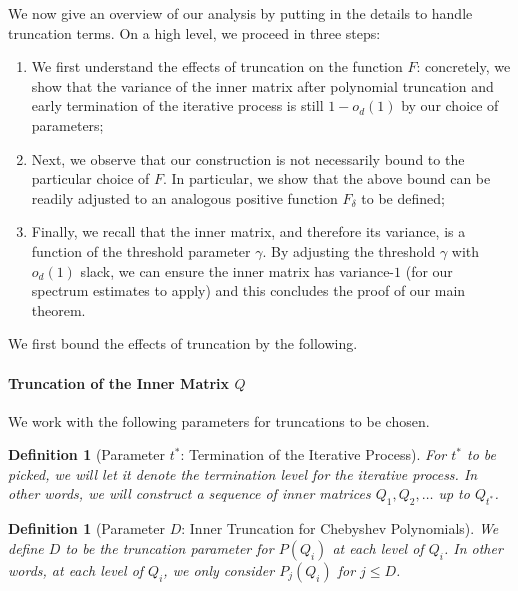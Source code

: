 \documentclass[12pt]{article}
\newtheorem{definition}[theorem]{Definition}
\begin{document}
We now give an overview of our analysis by putting in the details to handle truncation terms. On a high level, we proceed in three steps:
\begin{enumerate}
	\item We first understand the effects of truncation on the function $F$: concretely, we show that the variance of the inner matrix after polynomial truncation and early termination of the iterative process is still $1-o_d(1)$ by our choice of parameters;
	\item Next, we observe that our construction is not necessarily bound %
    to the particular choice of $F$. In particular, we show that the above bound can be readily adjusted to an analogous positive function $F_\delta$ to be defined;
	\item Finally, we recall that the inner matrix, and therefore its variance, is a function of the threshold parameter $\gamma$. By adjusting the threshold $\gamma$ with $o_d(1)$ slack, we can ensure the inner matrix has variance-$1$ (for our spectrum estimates to apply) and this concludes the proof of our main theorem.
\end{enumerate}


We first bound the effects of truncation by the following.
%
%


 
 \paragraph{Truncation of the Inner Matrix $Q$}
 We work with the following parameters for truncations to be chosen. 
\begin{definition}[Parameter $t^*$: Termination of the Iterative Process]
    For $t^*$ to be picked, we will let it denote the termination level for the iterative process. In other words, we will construct a sequence of inner matrices $Q_1, Q_2,\dots  $ up to $Q_{t^*}$. 
\end{definition}

\begin{definition}[Parameter $D$: Inner Truncation for Chebyshev Polynomials] \label{def:inner-trunc}
	We define $D$ to be the truncation parameter for $P(Q_i)$ at each level of $Q_i$. In other words, at each level of $Q_i$, we only consider $P_{j}(Q_i)$ for $j\leq D$. 
\end{definition}
\end{document}
